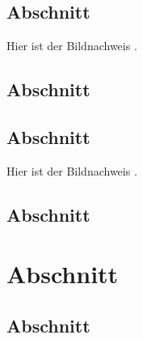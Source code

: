 \documentclass{var}
\begin{document}
\subsection{Abschnitt}
\lipsum[20]Hier ist der Bildnachweis .
\subsection{Abschnitt}
\lipsum[20]
\subsection{Abschnitt}
\lipsum[20]Hier ist der Bildnachweis .
\subsection{Abschnitt}
\lipsum[20]
\section{Abschnitt}
\lipsum[20]
\subsection{Abschnitt}
\lipsum[20]
\end{document}
